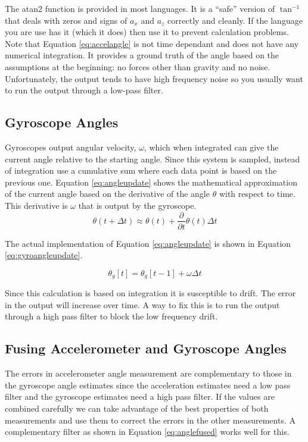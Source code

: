 The atan2 function is provided in most languages. It is a ``safe'' version of $\tan^{-1}$ that deals with 
zeros and signs of $a_x$ and $a_z$ correctly and cleanly. If the language you are use has it (which it does)
then use it to prevent calculation problems. Note that Equation \ref{eq:accelangle} is not time dependant
and does not have any numerical integration. It provides a ground truth of the angle based on the assumptions
at the beginning: no forces other than gravity and no noise. Unfortunately, the output tends to have high frequency
noise so you usually want to run the output through a low-pass filter.

\subsection{Gyroscope Angles}
Gyroscopes output angular velocity, $\omega$, which when integrated can give the current angle relative to the starting
angle. Since this system is sampled, instead of integration use a cumulative sum where each data point is based on the 
previous one. Equation \ref{eq:angleupdate} shows the mathematical approximation of the current angle based on the 
derivative of the angle $\theta$ with respect to time. This derivative is $\omega$ that is output by the gyroscope.
\begin{equation}
	\label{eq:angleupdate}
	\theta(t + \Delta t) \approx \theta(t) + \frac{\partial}{\partial t}\theta(t)\Delta t
\end{equation}

The actual implementation of Equation \ref{eq:angleupdate} is shown in Equation \ref{eq:gyroangleupdate}.

\begin{equation}
	\label{eq:gyroangleupdate}
	\theta_g[t] = \theta_g[t-1] + \omega\Delta t
\end{equation}

Since this calculation is based on integration it is susceptible to drift. The error in the output will 
increase over time. A way to fix this is to run the output through a high pass filter to block the 
low frequency drift.

\subsection{Fusing Accelerometer and Gyroscope Angles}
The errors in accelerometer angle measurement are complementary to those in the gyroscope angle estimates 
since the acceleration estimates need a low pass filter and the gyroscope estimates need a high pass filter.
If the values are combined carefully we can take advantage of the best properties of both measurements and 
use them to correct the errors in the other measurements. A complementary filter as shown in Equation 
\ref{eq:anglefused} works well for this.


